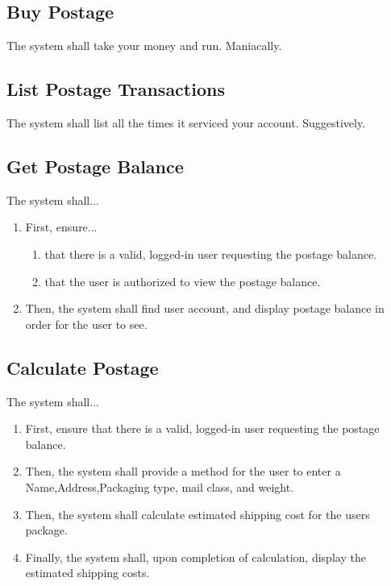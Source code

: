 \documentclass{scrreprt}
\begin{document}
\subsection{Buy Postage}

The system shall take your money and run. Maniacally.

\subsection{List Postage Transactions}

The system shall list all the times it serviced your account. Suggestively.

\subsection{Get Postage Balance}

The system shall...

\begin{enumerate}
\item First, ensure...
\begin{enumerate}
\item that there is a valid, logged-in user requesting the postage balance.
\item that the user is authorized to view the postage balance.
\end{enumerate}
\item Then, the system shall find user account, and display postage balance 
in order for the user to see.
\end{enumerate}

\subsection{Calculate Postage}

The system shall...

\begin{enumerate}
\item First, ensure that there is a valid, logged-in user requesting the
postage balance.  
\item Then, the system shall provide a method for the user to enter a
Name,Address,Packaging type, mail class, and weight.
\item Then, the system shall calculate estimated shipping cost for the users
package.
\item Finally, the system shall, upon completion of calculation, display the
estimated shipping costs.  
\end{enumerate}
\end{document}
